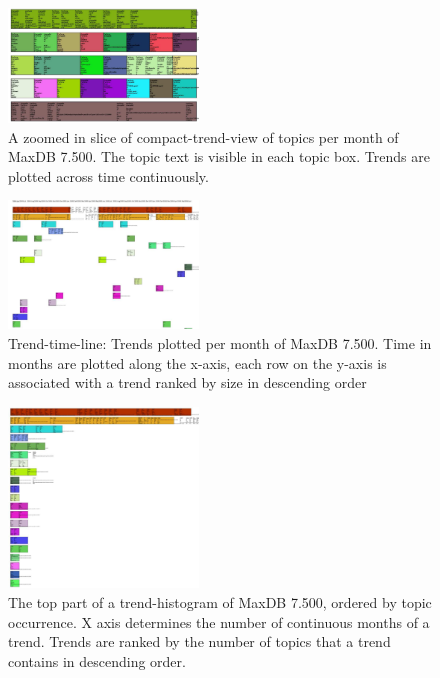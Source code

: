 \documentclass[times, 10pt,twocolumn]{article}
\begin{document}
\begin{figure}
  \centering
  \includegraphics[width=0.45\textwidth]{fixed-time-smear-plot-cropped}
  \caption{A zoomed in slice of compact-trend-view of topics per month of MaxDB 7.500. The topic text is visible in each topic box. Trends are plotted across time continuously.}
  \label{fig:zoomedsmear}
\end{figure}


\begin{figure}
  \centering
  \includegraphics[width=0.45\textwidth]{class-smear-plot-crop-scaled}
  \caption{Trend-time-line: Trends plotted per month of MaxDB 7.500. Time in months are plotted along the x-axis, each row on the y-axis is associated with a trend ranked by size in descending order}         
  \label{fig:trendtimeline}
\end{figure}


\begin{figure}
  \centering
  \includegraphics[width=0.45\textwidth]{histogram-cropped-scaled}
  \caption{The top part of a trend-histogram of MaxDB 7.500, ordered
    by topic occurrence. X axis determines the number of continuous
    months of a trend. Trends are ranked by the number of topics that
    a trend contains in descending order.}
  \label{fig:histogram}
\end{figure}
\end{document}
